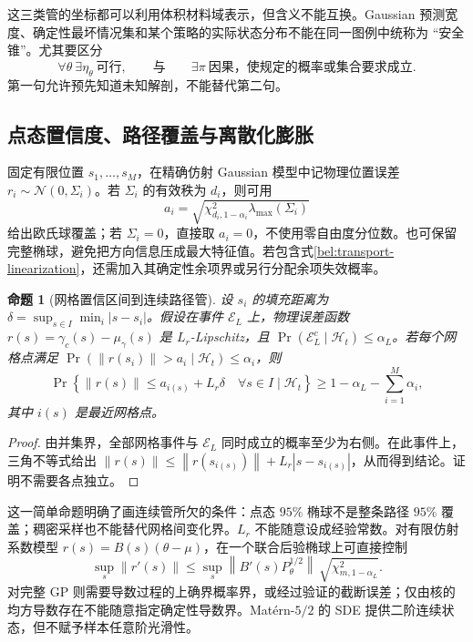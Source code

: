 \documentclass[11pt,a4paper]{article}
\numberwithin{equation}{section}
\newtheorem{proposition}[theorem]{命题}
\theoremstyle{definition}
\newcommand{\norm}[1]{\left\lVert#1\right\rVert}
\newcommand{\abs}[1]{\left\lvert#1\right\rvert}
\begin{document}
这三类管的坐标都可以利用体积材料域表示，但含义不能互换。Gaussian 预测宽度、确定性最坏情况集和某个策略的实际状态分布不能在同一图例中统称为 ``安全锥''。尤其要区分
\begin{equation}
 \forall\theta\ \exists\eta_\theta\ \text{可行},
 \qquad\text{与}\qquad
 \exists\pi\ \text{因果，使规定的概率或集合要求成立}.
 \label{bel:quantifier}
\end{equation}
第一句允许预先知道未知解剖，不能替代第二句。

\subsection{点态置信度、路径覆盖与离散化膨胀}
\label{bel:simultaneous}

固定有限位置 $s_1,\ldots,s_M$，在精确仿射 Gaussian 模型中记物理位置误差 $r_i\sim\mathcal N(0,\Sigma_i)$。若 $\Sigma_i$ 的有效秩为 $d_i$，则可用
\begin{equation}
 a_i=\sqrt{\chi^2_{d_i,1-\alpha_i}\lambda_{\max}(\Sigma_i)}
 \label{bel:point-radius}
\end{equation}
给出欧氏球覆盖；若 $\Sigma_i=0$，直接取 $a_i=0$，不使用零自由度分位数。也可保留完整椭球，避免把方向信息压成最大特征值。若包含式\eqref{bel:transport-linearization}，还需加入其确定性余项界或另行分配余项失效概率。

\begin{proposition}[网格置信区间到连续路径管]
\label{bel:prop-path}
设 $s_i$ 的填充距离为 $\delta=\sup_{s\in I}\min_i\abs{s-s_i}$。假设在事件 $\mathcal E_L$ 上，物理误差函数 $r(s)=\gamma_c(s)-\mu_\gamma(s)$ 是 $L_r$-Lipschitz，且
$\Pr(\mathcal E_L^c\mid\mathcal H_t)\le\alpha_L$。若每个网格点满足
$\Pr(\norm{r(s_i)}>a_i\mid\mathcal H_t)\le\alpha_i$，则
\begin{equation}
 \Pr\left\{\norm{r(s)}\le a_{i(s)}+L_r\delta\quad
 \forall s\in I\mid\mathcal H_t\right\}
 \ge1-\alpha_L-\sum_{i=1}^M\alpha_i,
 \label{bel:inflated-tube}
\end{equation}
其中 $i(s)$ 是最近网格点。
\end{proposition}
\begin{proof}
由并集界，全部网格事件与 $\mathcal E_L$ 同时成立的概率至少为右侧。在此事件上，三角不等式给出
$\norm{r(s)}\le\norm{r(s_{i(s)})}+L_r\abs{s-s_{i(s)}}$，从而得到结论。证明不需要各点独立。
\end{proof}

这一简单命题明确了画连续管所欠的条件：点态 $95\%$ 椭球不是整条路径 $95\%$ 覆盖；稠密采样也不能替代网格间变化界。$L_r$ 不能随意设成经验常数。对有限仿射系数模型 $r(s)=B(s)(\theta-\mu)$，在一个联合后验椭球上可直接控制
\begin{equation}
 \sup_s\norm{r'(s)}
 \le\sup_s\norm{B'(s)P_\theta^{1/2}}\,
 \sqrt{\chi^2_{m,1-\alpha_L}}.
 \label{bel:finite-lipschitz}
\end{equation}
对完整 GP 则需要导数过程的上确界概率界，或经过验证的截断误差；仅由核的均方导数存在不能随意指定确定性导数界。Mat\'ern-$5/2$ 的 SDE 提供二阶连续状态，但不赋予样本任意阶光滑性。
\end{document}
